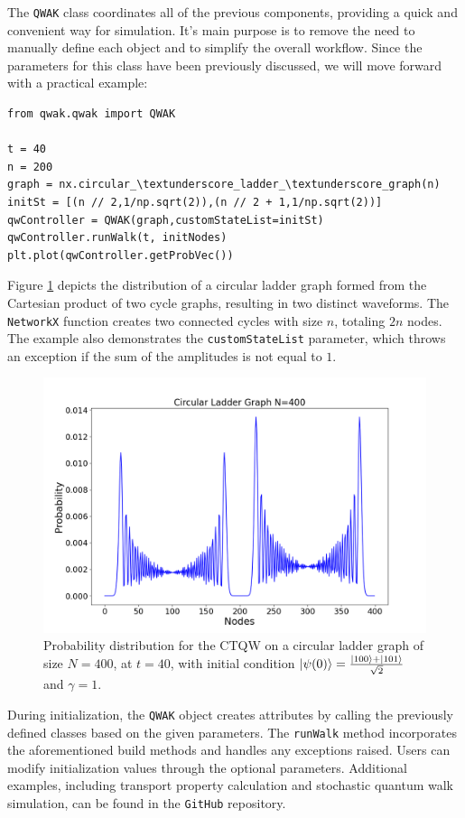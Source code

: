 \documentclass[../../dissertation.tex]{subfiles}
\begin{document}
The \texttt{QWAK} class coordinates all of the previous components, providing a
quick and convenient way for simulation.  It's main purpose is to remove the
need to manually define each object and to simplify the overall workflow. Since
the parameters for this class have been previously discussed, we will move
forward with a practical example:

\begin{lstlisting}[style=code,escapeinside={__}]
from qwak.qwak import QWAK

t = 40
n = 200
graph = nx.circular_\textunderscore_ladder_\textunderscore_graph(n)
initSt = [(n // 2,1/np.sqrt(2)),(n // 2 + 1,1/np.sqrt(2))]
qwController = QWAK(graph,customStateList=initSt)
qwController.runWalk(t, initNodes)
plt.plot(qwController.getProbVec())
\end{lstlisting}

Figure \ref{fig:probDistCircLadder} depicts the distribution of a circular
ladder graph formed from the Cartesian product of two cycle graphs, resulting
in two distinct waveforms. The \texttt{NetworkX} function creates two connected
cycles with size $n$, totaling $2n$ nodes. The example also demonstrates the
\texttt{customStateList} parameter, which throws an exception if the sum of the
amplitudes is not equal to $1$.\par

\begin{figure}[!h]
\centering
\includegraphics[scale=\mysinglefigurescale]{img/QWAK/UndirectedDynamics/circularLadderDynamics_N400_TMAX40.png}
\caption{Probability distribution for the CTQW on a
circular ladder graph of size $N=400$, at $t=40$, with initial condition
$\ket{\psi(0)}=\frac{\ket{100}+\ket{101}}{\sqrt{2}}$ and $\gamma=1$.}
\label{fig:probDistCircLadder}
\end{figure}

During initialization, the \texttt{QWAK} object creates attributes by calling
the previously defined classes based on the given parameters. The
\texttt{runWalk} method incorporates the aforementioned build methods and
handles any exceptions raised. Users can modify initialization values through
the optional parameters. Additional examples, including transport property
calculation and stochastic quantum walk simulation, can be found in the
\texttt{GitHub} repository.
\end{document}
